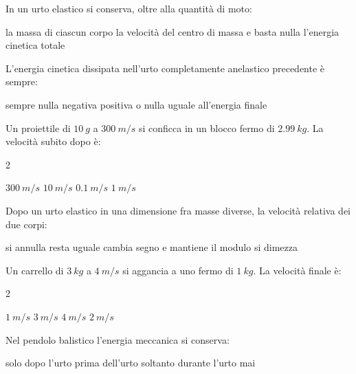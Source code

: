 \documentclass[a4paper,10pt]{exam}
\newcommand{\um}[2]{\SI[output-decimal-marker={,}]{#1}{#2}}
\begin{document}
\vspace{2mm}
\begin{questions}
\question In un urto elastico si conserva, oltre alla quantità di moto:
\vspace{0.2em}
\begin{choices}
\choice la massa di ciascun corpo
\choice la velocità del centro di massa e basta
\choice nulla
\choice l'energia cinetica totale
\end{choices}

\question L'energia cinetica dissipata nell'urto completamente anelastico precedente è sempre:
\vspace{0.2em}
\begin{choices}
\choice sempre nulla
\choice negativa
\choice positiva o nulla
\choice uguale all'energia finale
\end{choices}

\question Un proiettile di $\um{10}{g}$ a $\um{300}{m/s}$ si conficca in un blocco fermo di $\um{2.99}{kg}$. La velocità subito dopo è:
\vspace{0.2em}
\begin{multicols}{2}
\begin{choices}
\choice $\um{300}{m/s}$
\choice $\um{10}{m/s}$
\choice $\um{0.1}{m/s}$
\choice $\um{1}{m/s}$
\end{choices}
\end{multicols}

\question Dopo un urto elastico in una dimensione fra masse diverse, la velocità relativa dei due corpi:
\vspace{0.2em}
\begin{choices}
\choice si annulla
\choice resta uguale
\choice cambia segno e mantiene il modulo
\choice si dimezza
\end{choices}

\question Un carrello di $\um{3}{kg}$ a $\um{4}{m/s}$ si aggancia a uno fermo di $\um{1}{kg}$. La velocità finale è:
\vspace{0.2em}
\begin{multicols}{2}
\begin{choices}
\choice $\um{1}{m/s}$
\choice $\um{3}{m/s}$
\choice $\um{4}{m/s}$
\choice $\um{2}{m/s}$
\end{choices}
\end{multicols}

\question Nel pendolo balistico l'energia meccanica si conserva:
\vspace{0.2em}
\begin{choices}
\choice solo dopo l'urto
\choice prima dell'urto soltanto
\choice durante l'urto
\choice mai
\end{choices}


\end{questions}
\end{document}
